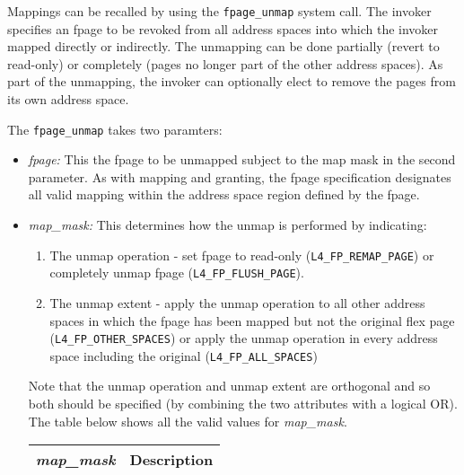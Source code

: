 
Mappings can be recalled by using the {\footnotesize\verb+fpage_unmap+} system
call.  The invoker  specifies an fpage to  be revoked from  all address spaces
into which the  invoker mapped directly or indirectly.   The unmapping can  be
done partially  (revert to read-only) or completely  (pages no  longer part of
the other   address  spaces).   As part  of  the  unmapping,  the  invoker can
optionally elect to remove the pages from its own address space.

\cbstart

The {\footnotesize\verb+fpage_unmap+} takes two paramters:

\begin{itemize}

\item \emph{fpage:} This the fpage to  be unmapped subject  to the map mask in
the second  parameter. As with mapping and   granting, the fpage specification
designates all valid mapping  within the address  space region defined  by the
fpage.

\item \emph{map\_mask:} This determines how the unmap is performed
by indicating:

	\begin{enumerate}

	\item The unmap operation - set fpage to read-only
	({\footnotesize\verb+L4_FP_REMAP_PAGE+}) or completely unmap fpage
	({\footnotesize\verb+L4_FP_FLUSH_PAGE+}).

	\item The unmap extent - apply the unmap operation to all other address
	spaces in which the fpage has been mapped but not the original flex
	page ({\footnotesize\verb+L4_FP_OTHER_SPACES+}) or apply the unmap
	operation in every address space including the original
	({\footnotesize\verb+L4_FP_ALL_SPACES+})

	\end{enumerate}

	Note that the  unmap operation and  unmap extent are orthogonal and so
	both should  be  specified (by combining the    two attributes with  a
	logical   OR). The  table   below shows   all  the  valid  values  for
	\emph{map\_mask}.

	\begin{tabular}{|c|c|}  \hline \hline

	\emph{map\_mask} & Description \\ \hline
	

\end{tabular}
\end{itemize}
